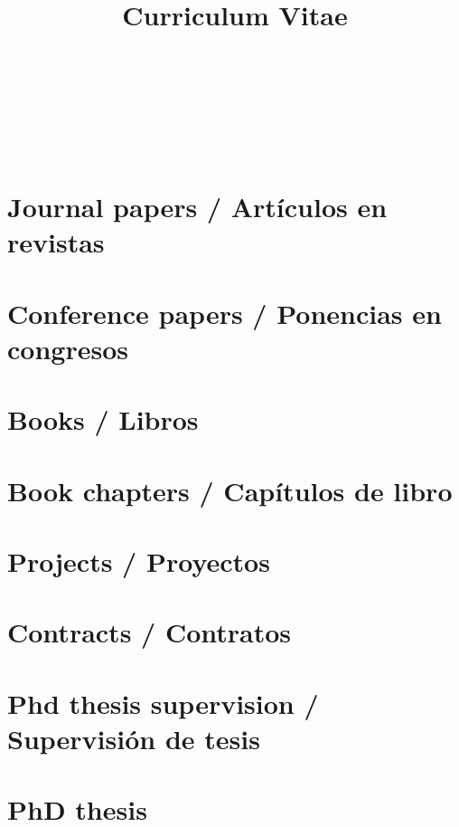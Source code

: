 \documentclass{article}
\title{Curriculum Vitae}
\author{
  \begin{tabular}{c}
      \\
    ~\\
     \\
     \\
     \\
    ~\\
     \\
    
  \end{tabular}
}
\begin{document}
\maketitle

\tableofcontents

\renewcommand{\refname}{}
\section{Journal papers / Artículos en revistas}


\renewcommand{\refname}{}
\section{Conference papers / Ponencias en congresos}


\renewcommand{\refname}{}
\section{Books / Libros}


\renewcommand{\refname}{}
\section{Book chapters / Capítulos de libro}


\renewcommand{\refname}{}
\section{Projects / Proyectos}


\renewcommand{\refname}{}
\section{Contracts / Contratos}


\renewcommand{\refname}{}
\section{Phd thesis supervision / Supervisión de tesis}


\section{PhD thesis}

\end{document}
